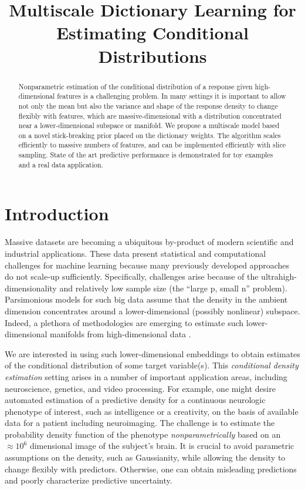 \documentclass{article} %
\title{Multiscale Dictionary Learning for \\ Estimating Conditional Distributions}
\begin{document}
\renewcommand{\theenumi}{(\roman{enumi})}%


\maketitle

\begin{abstract}
Nonparametric estimation of the conditional distribution of a response given high-dimensional features is a challenging problem.  In many settings it is important to allow not only the mean but also the variance and shape of the response density to change flexibly with features, which are massive-dimensional with a distribution concentrated near a lower-dimensional subspace or manifold.  We propose a  multiscale model based on a novel stick-breaking prior placed on the dictionary weights.  The algorithm scales efficiently to massive numbers of features, and can be implemented efficiently with slice sampling.  State of the art predictive performance is demonstrated for toy examples and a real data application.
\end{abstract}


\section{Introduction}


Massive datasets are becoming a ubiquitous by-product of modern scientific and industrial applications. These data present statistical and computational challenges for machine learning because many previously developed approaches do not scale-up sufficiently.  Specifically, challenges arise because of the ultrahigh-dimensionality and relatively low sample size (the ``large p, small n'' problem).  Parsimonious models for such big data assume that the density in the ambient dimension concentrates around a lower-dimensional (possibly nonlinear) subspace.  Indeed, a plethora of methodologies are emerging to estimate such lower-dimensional manifolds from high-dimensional data \cite{Manifold, Maggioni}.  

We are interested in using such lower-dimensional embeddings to obtain estimates of the conditional distribution of some target variable(s).  This \emph{conditional density estimation} setting arises in a number of important application areas, including neuroscience, genetics, and video processing.  For example, one might desire automated estimation of a predictive density for a continuous neurologic { phenotype} of interest, such as intelligence or a creativity, on the basis of available data for a patient including neuroimaging.  The challenge is to estimate the probability density function of the phenotype {\em nonparametrically} based on an $\approx 10^6$ dimensional image of the subject's brain.  It is crucial to avoid parametric assumptions on the density, such as Gaussianity, while allowing the density to change flexibly with predictors.  Otherwise, one can obtain misleading predictions and poorly characterize predictive uncertainty.
\end{document}

